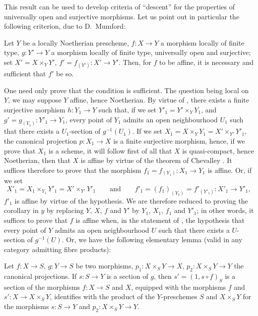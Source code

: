 This result can be used to develop criteria of ``descent'' for the properties of universally open and surjective morphisms.
Let us point out in particular the following criterion, due to D.\ Mumford:

\begin{corollary}[14.5.11]
\label{IV.14.5.11}
Let $Y$ be a locally Noetherian prescheme, $f:X\to Y$ a morphism locally of finite type, $g:Y'\to Y$ a morphism locally of finite type, universally open and surjective; set $X'=X\times_Y Y'$, $f'=f_{(Y')}:X'\to Y'$.
Then, for $f$ to be affine, it is necessary and sufficient that $f'$ be so.
\end{corollary}

One need only prove that the condition is sufficient.
The question being local on $Y$, we may suppose $Y$ affine, hence Noetherian.
By virtue of , there exists a finite surjective morphism $h:Y_1\to Y$ such that, if we set $Y'_1=Y'\times_Y Y_1$, and $g'=g_{(Y_1)}:Y'_1\to Y_1$, every point of $Y_1$ admits an open neighbourhood $U_1$ such that there exists a $U_1$-section of $g^{-1}(U_1)$.
If we set $X_1=X\times_Y Y_1=X'\times_{Y'}Y'_1$, the canonical projection $p:X_1\to X$ is a finite surjective morphism, hence, if we prove that $X_1$ is a scheme, it will follow first of all that $X$ is quasi-compact, hence Noetherian, then that $X$ is affine by virtue of the theorem of Chevalley .
It suffices therefore to prove that the morphism $f_1=f_{(Y_1)}:X_1\to Y_1$ is affine.
Or, if we set
\[
  X'_1=X_1\times_{Y_1}Y'_1=X'\times_{Y'}Y'_1 \qquad\text{and}\qquad f'_1=(f_1)_{(Y_1)}=f'_{(Y'_1)}:X'_1\to Y'_1,
\]
$f'_1$ is affine by virtue of the hypothesis.
We are therefore reduced to proving the corollary in $y$ by replacing $Y$, $X$, $f$ and $Y'$ by $Y_1$, $X_1$, $f_1$ and $Y'_1$; in other words, it suffices to prove that $f$ is affine when, in the statement of , the hypothesis that every point of $Y$ admits an open neighbourhood $U$ such that there exists a $U$-section of $g^{-1}(U)$.
Or, we have the following elementary lemma (valid in any category admitting fibre products):

\begin{lemma}[14.5.11.1]
\label{IV.14.5.11.1}
Let $f:X\to S$, $g:Y\to S$ be two morphisms, $p_1:X\times_S Y\to X$, $p_2:X\times_S Y\to Y$ the canonical projections.
If $s:S\to Y$ is a section of $g$, then $s'=(1,s\circ f)_S$ is a section of the morphisms $f:X\to S$ and $X$, equipped with the morphisms $f$ and $s':X\to X\times_S Y$, identifies with the product of the $Y$-preschemes $S$ and $X\times_S Y$ for the morphisms $s:S\to Y$ and $p_2:X\times_S Y\to Y$.
\end{lemma}

